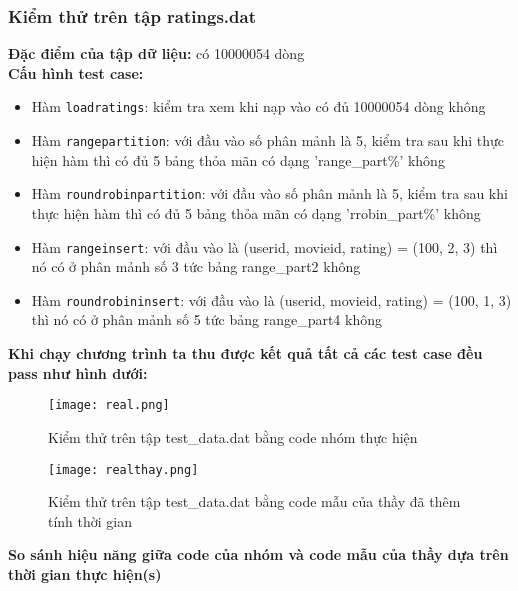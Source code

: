 \documentclass[a4paper]{article}
\begin{document}
\subsubsection{Kiểm thử trên tập ratings.dat}

\textbf{Đặc điểm của tập dữ liệu:} có 10000054 dòng\\
\textbf{Cấu hình test case:}
\begin{itemize}
    \item Hàm \texttt{loadratings}: kiểm tra xem khi nạp vào có đủ 10000054 dòng không
    \item Hàm \texttt{rangepartition}: với đầu vào số phân mảnh là 5, kiểm tra sau khi thực hiện hàm thì có đủ 5 bảng thỏa mãn có dạng 'range\_part\%' không
    \item Hàm \texttt{roundrobinpartition}: với đầu vào số phân mảnh là 5, kiểm tra sau khi thực hiện hàm thì có đủ 5 bảng thỏa mãn có dạng 'rrobin\_part\%' không
    \item Hàm \texttt{rangeinsert}: với đầu vào là (userid, movieid, rating) = (100, 2, 3) thì nó có ở phân mảnh số 3 tức bảng range\_part2 không
    \item Hàm \texttt{roundrobininsert}: với đầu vào là (userid, movieid, rating) = (100, 1, 3) thì nó có ở phân mảnh số 5 tức bảng range\_part4 không
\end{itemize}
\textbf{Khi chạy chương trình ta thu được kết quả tất cả các test case đều pass như hình dưới:}
\begin{figure}[H]
    \centering
    \texttt{[image: real.png]}
    \caption{Kiểm thử trên tập test\_data.dat bằng code nhóm thực hiện}
    

\end{figure}
\begin{figure}[H]
    \centering
    \texttt{[image: realthay.png]}
    \caption{Kiểm thử trên tập test\_data.dat bằng code mẫu của thầy đã thêm tính thời gian}
    

\end{figure}
\textbf{So sánh hiệu năng giữa code của nhóm và code mẫu của thầy dựa trên thời gian thực hiện(s)}
\end{document}
